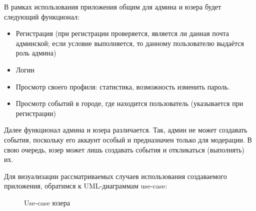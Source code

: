 \documentclass[diploma]{SCWorks}
\begin{document}
В рамках использования приложения общим для админа и юзера будет следующий 
функционал:
\begin{itemize}
    \item Регистрация (при регистрации проверяется, является ли данная почта 
    админской; если условие выполняется, то данному пользователю выдаётся роль
    админа)
    \item Логин
    \item Просмотр своего профиля: статистика, возможность изменить пароль.
    \item Просмотр событий в городе, где находится пользователь (указывается 
    при регистрации)
\end{itemize}

Далее функционал админа и юзера различается. Так, админ не может создавать 
события, поскольку его аккаунт особый и предназначен только для модерации.
В свою очередь, юзер может лишь создавать события и откликаться (выполнять) их.

Для визуализации рассматриваемых случаев использования создаваемого приложения, 
обратимся к UML-диаграммам use-case:

\begin{figure}[H]
	\caption{Use-case юзера}
	\label{pic:use-case_user}
\end{figure}
\end{document}
